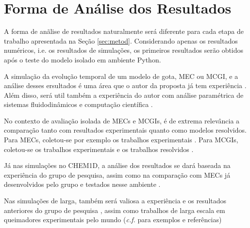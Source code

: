 
\section{Forma de Análise dos Resultados} \label{sec:resultados}

A forma de anãlise de resultados naturalmente será diferente para cada etapa de trabalho apresentada na Seção \ref{sec:metod}.
Considerando apenas os resultados numéricos, i.e. os resultados de simulações, os primeiros resultados serão obtidos após o teste do modelo isolado em ambiente Python. 

A simulação da evolução temporal de um modelo de gota, MEC ou MCGI, e a análise desses ersultados é uma área que o autor da proposta já tem experiência \cite{HenningsJ2024MT}. 
Além disso, será util também a experiência do autor com análise paramétrica de sistemas fluidodinâmicos e computação científica .

No contexto de avaliação isolada de MECs e MCGIs, é de extrema relevância a comparação tanto com resultados experimentais quanto como modelos resolvidos.
Para MECs, coletou-se por exemplo os trabalhos experimentais .
Para MCGIs, coletou-se os trabalhos experimentais  e os trabalhos resolvidos .

Já nas simulações no CHEM1D, a análise dos resultados se dará baseada na experiência do grupo de pesquisa, assim como na comparação com MECs já desenvolvidos pelo grupo e testados nesse ambiente \cite{SacomanoF2018CTM,SacomanoF2019IJHMT,SacomanoF2021Fluids,SacomanoF2024CF,SacomanoF2025CF}.

Nas simulações de larga, também será valiosa a experiência e os resultados anteriores do grupo de pesquisa \cite{SacomanoF2017CF,SacomanoF2020CF}, assim como trabalhos de larga escala em queimadores experimentais pelo mundo  (\emph{c.f.}  para exemplos e referências)
 




\cite{HenningsJ2023BT}